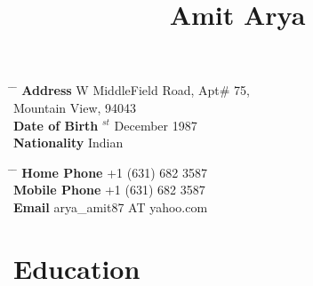 \documentclass[10pt]{article} %
\begin{document}

\title{Amit Arya} %


\parbox{0.5\textwidth}{ %
\begin{tabbing} %
\hspace{3cm} \= \hspace{4cm} \= \kill %
{\bf Address}  W MiddleField Road, Apt\# 75,\\ %
\> Mountain View, 94043 \\ %
{\bf Date of Birth} $^{st}$ December 1987 \\ %
{\bf Nationality} \> Indian \\%
\end{tabbing}}
\hfill %
\parbox{0.5\textwidth}{ %
\begin{tabbing} %
\hspace{3cm} \= \hspace{4cm} \= \kill %
{\bf Home Phone} \> +1 (631) 682 3587 \\ %
{\bf Mobile Phone} \> +1 (631) 682 3587 \\ %
{\bf Email} \> {arya\_amit87 AT yahoo.com} \\ %
\end{tabbing}}


\section{Education}


\end{document}
